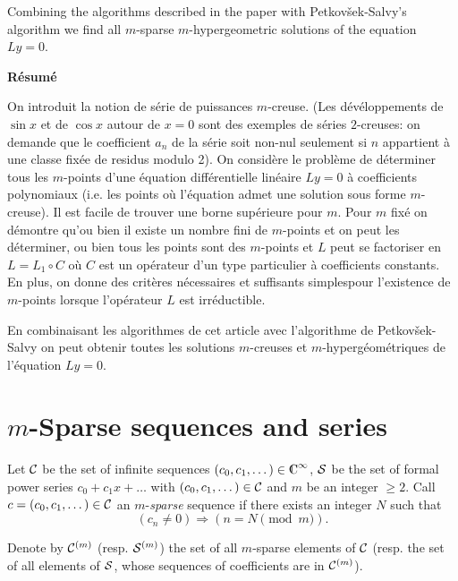 Combining the algorithms described in the paper with
Petkov\v sek-Salvy's algorithm we find all $m$-sparse
$m$-hypergeometric solutions of the equation $Ly=0$.

\begin{center}
\large\bf R\'esum\'e
\end{center}

On introduit la notion de s\'erie de puissances
$m$-creuse. (Les d\'ev\'elop\-pe\-ments
de $\sin x$ et de $\cos x$ autour de $x=0$ sont des exemples
de s\'eries $2$-creuses:
on demande que le coefficient $a_n$ de la s\'erie
soit non-nul seulement si $n$ appartient \`a une classe
fix\'ee de residus modulo 2).
On consid\`ere le probl\`eme de d\'eterminer
tous les $m$-points d'une \'equation diff\'erentielle
lin\'eaire $L y = 0$ \`a coefficients polynomiaux
(i.e. les points o\`u l'\'equation admet une solution
sous forme $m$-creuse).
Il est facile de trouver une borne sup\'erieure pour $m$.
Pour $m$ fix\'e on d\'emontre qu'ou bien il existe un
nombre fini de $m$-points et on peut les d\'eterminer,
ou bien tous les points sont des $m$-points et $L$ peut
se factoriser en $L = L_1 \circ C$ o\`u $C$ est un
op\'erateur d'un type particulier \`a coefficients
constants.
En plus, on donne des crit\`eres n\'ecessaires
et suffisants  simplespour l'existence de $m$-points lorsque
l'op\'erateur $L$ est irr\'eductible.

En combinaisant les algorithmes de cet article avec
l'algorithme de Petkov\v sek-Salvy on peut obtenir
toutes les solutions $m$-creuses et $m$-hyperg\'eom\'etriques
de l'\'equation $L y = 0$.


\section{$m$-Sparse sequences and series}
Let ${\cal C}$ be the set of infinite sequences $(c_0,c_1,\dots) \in
\complex^\infty$,
${\cal S}$ be the set of formal power series $c_0+c_1x+\dots$ with
$(c_0,c_1,\dots) \in {\cal C}$ and $m$ be an integer $\ge 2$.
Call $c=(c_0,c_1,\dots)\in {\cal C}$ an $m$-{\em sparse}
sequence if  there exists an integer $N$ such that
\begin{equation}
\label{one}
(c_n \neq 0) \Rightarrow (n = N \pmod{m}).
\end{equation}

Denote by ${\cal C}^{(m)}$ (resp. ${\cal S}^{(m)}$) the set of all $m$-sparse
elements of ${\cal C}$  (resp. the set of all elements of ${\cal S}$,
whose sequences of coefficients are in ${\cal C}^{(m)}$).

